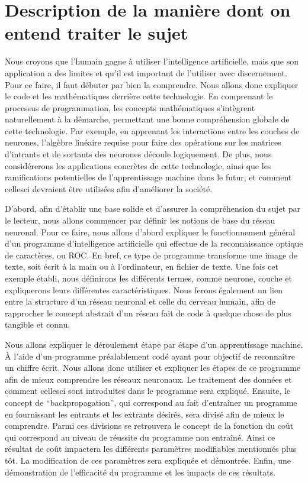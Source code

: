 \documentclass[letterpaper,10pt,french]{sphinxmanual}
\begin{document}


\section{Description de la manière dont on entend traiter le sujet}
\label{\detokenize{description:description-de-la-maniere-dont-on-entend-traiter-le-sujet}}\label{\detokenize{description::doc}}
Nous croyons que l’humain gagne à utiliser l’intelligence artificielle, mais que son application a des limites et qu’il est important de l’utiliser avec discernement. Pour ce faire, il faut débuter par bien la comprendre. Nous allons donc expliquer le code et les mathématiques derrière cette technologie. En comprenant le processus de programmation, les concepts mathématiques s’intègrent naturellement à la démarche, permettant une bonne compréhension globale de cette technologie. Par exemple, en apprenant les interactions entre les couches de neurones, l’algèbre linéaire requise pour faire des opérations sur les matrices d’intrants et de sortants des neurones découle logiquement. De plus, nous considérerons les applications concrètes de cette technologie, ainsi que les ramifications potentielles de l’apprentissage machine dans le futur, et comment celles\sphinxhyphen{}ci devraient être utilisées afin d’améliorer la société.

D’abord, afin d’établir une base solide et d’assurer la compréhension du sujet par le lecteur, nous allons commencer par définir les notions de base du réseau neuronal. Pour ce faire, nous allons d’abord expliquer le fonctionnement général d’un programme d’intelligence artificielle qui effectue de la reconnaissance optique de caractères, ou ROC. En bref, ce type de programme transforme une image de texte, soit écrit à la main ou à l’ordinateur, en fichier de texte. Une fois cet exemple établi, nous définirons les différents termes, comme neurone, couche et expliquerons leurs différentes caractéristiques. Nous ferons également un lien entre la structure d’un réseau neuronal et celle du cerveau humain, afin de rapprocher le concept abstrait d’un réseau fait de code à quelque chose de plus tangible et connu. 

Nous allons expliquer le déroulement étape par étape d’un apprentissage machine. À l’aide d’un programme préalablement codé ayant pour objectif de reconnaître un chiffre écrit. Nous allons donc utiliser et expliquer les étapes de ce programme afin de mieux comprendre les réseaux neuronaux. Le  traitement des données et comment celles\sphinxhyphen{}ci sont introduites dans le programme sera expliqué. Ensuite, le concept de “backpropagation”, qui correspond au fait d’entraîner un programme en fournissant les entrants et les extrants désirés, sera divisé afin de mieux le comprendre.  Parmi ces divisions se retrouvera le concept de la fonction du coût qui correspond au niveau de réussite du programme non entraîné. Ainsi ce résultat de coût impactera les différents paramètres modifiables mentionnés plus tôt. La modification de ces paramètres sera expliquée et démontrée. Enfin, une démonstration de l’efficacité du programme et les impacts de ces résultats.
\end{document}
